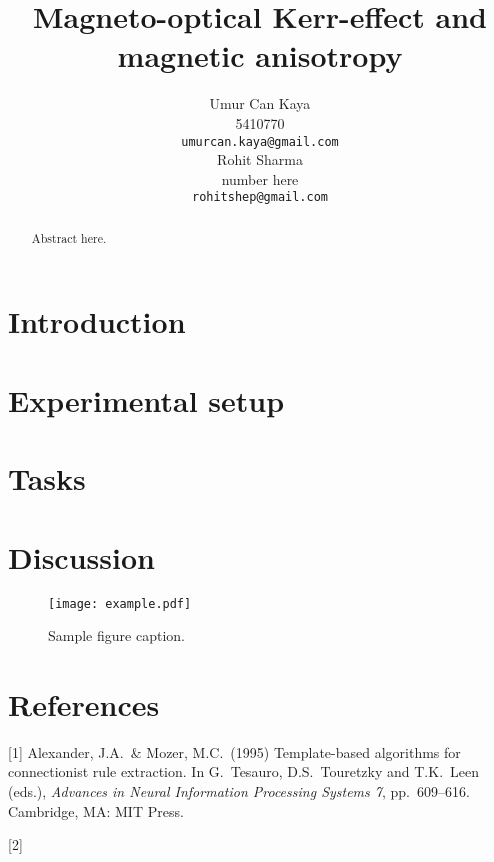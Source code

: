 \documentclass{article}
\title{Magneto-optical Kerr-effect and magnetic anisotropy}
\author{
Umur Can Kaya\\
5410770\\
\texttt{umurcan.kaya@gmail.com}\\
\And
Rohit Sharma\\
number here\\
\texttt{rohitshep@gmail.com}\\
}
\begin{document}
\maketitle

\begin{abstract}
Abstract here.
\end{abstract}

\section{Introduction}

\section{Experimental setup}
\section{Tasks}
\section{Discussion}

\begin{figure}[h!]
\centering
\texttt{[image: example.pdf]}
\caption{Sample figure caption.}
\end{figure}


\section*{References}

[1] Alexander, J.A.\ \& Mozer, M.C.\ (1995) Template-based algorithms for
connectionist rule extraction. In G.\ Tesauro, D.S.\ Touretzky and T.K.\ Leen
(eds.), {\it Advances in Neural Information Processing Systems 7},
pp.\ 609--616. Cambridge, MA: MIT Press.

[2]
\end{document}
